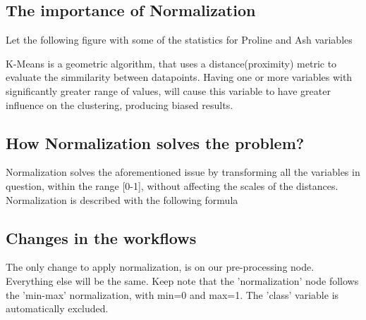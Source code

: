 \documentclass[11pt]{article}
\begin{document}
		\subsection*{The importance of Normalization}
			Let the following figure with some of the statistics for Proline and Ash variables

			K-Means is a geometric algorithm, that uses a distance(proximity) metric to evaluate the simmilarity between datapoints. Having one or more variables with significantly greater range of values, will cause this variable to have greater influence on the clustering, producing biased results.
		\subsection*{How Normalization solves the problem?}
			Normalization solves the aforementioned issue by transforming all the variables in question, within the range [0-1], without affecting the scales of the distances. Normalization is described with the following formula

			
			
		\subsection*{Changes in the workflows}
			The only change to apply normalization, is on our pre-processing node. Everything else will be the same. Keep note that the 'normalization' node follows the 'min-max' normalization, with min=0 and max=1. The 'class' variable is automatically excluded.

\end{document}
